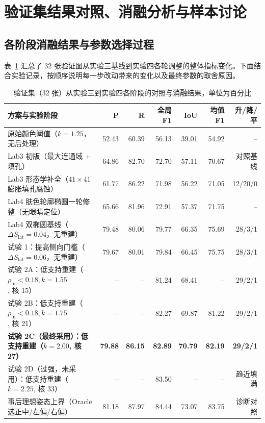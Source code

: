\section{验证集结果对照、消融分析与样本讨论}\label{sec:results}

\subsection{各阶段消融结果与参数选择过程}

表~\ref{tab:lab4_ablation} 汇总了 32 张验证图从实验三基线到实验四各轮调整的整体指标变化。下面结合实验记录，按顺序说明每一步改动带来的变化以及最终参数的取舍原因。

\begin{table}[H]
\centering\footnotesize
\setlength{\tabcolsep}{3pt}
\caption{验证集（32 张）从实验三到实验四各阶段的对照与消融结果，单位为百分比}\label{tab:lab4_ablation}
\begin{tabular}{lrrrrrr}
\toprule
方案与实验阶段 & P & R & 全局 F1 & IoU & 均值 F1 & 升/降/平 \\
\midrule
原始颜色阈值（$k=1.25$，无后处理） & 52.43 & 60.39 & 56.13 & 39.01 & 54.92 & -- \\
Lab3 初版（最大连通域 + 填孔） & 64.86 & 82.70 & 72.70 & 57.11 & 70.67 & 对照基线 \\
Lab3 形态学补全（$41\times41$ 膨胀填孔腐蚀） & 61.77 & 86.22 & 71.98 & 56.22 & 71.05 & 12/20/0 \\
Lab4 肤色轮廓椭圆一轮修整（无眼睛定位） & 65.66 & 81.96 & 72.91 & 57.37 & 71.75 & -- \\
Lab4 双椭圆基线（$\Delta S_{\text{lat}}=0.04$，无重建） & 79.48 & 80.06 & 79.77 & 66.35 & 75.69 & 28/3/1 \\
试验 1：提高侧向门槛（$\Delta S_{\text{lat}}=0.06$，无重建） & 79.67 & 80.01 & 79.84 & 66.45 & 75.75 & 28/3/1 \\
试验 2A：低支持重建（$\rho_{\text{in}}<0.18, k=1.55$, 核 15） & -- & -- & 81.24 & 68.41 & -- & 29/2/1 \\
试验 2B：低支持重建（$\rho_{\text{in}}<0.18, k=1.75$, 核 21） & -- & -- & 82.27 & 69.87 & 81.22 & 29/2/1 \\
\textbf{试验 2C（最终采用）：低支持重建（$k=2.00$, 核 27）} & \textbf{79.88} & \textbf{86.15} & \textbf{82.89} & \textbf{70.79} & \textbf{82.19} & \textbf{29/2/1} \\
试验 2D（过强，未采用）：低支持重建（$k=2.25$, 核 33） & -- & -- & 83.50 & -- & -- & 趋近填满 \\
事后理想姿态上界（Oracle 选正中/左偏/右偏） & 81.18 & 87.97 & 84.44 & 73.07 & 83.75 & 诊断对照 \\
\bottomrule
\end{tabular}
\end{table}

